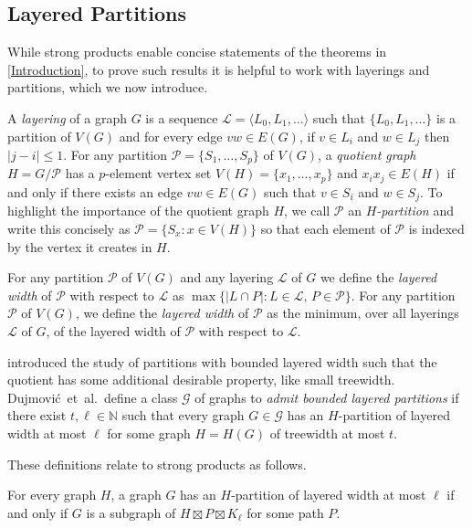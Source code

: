 \documentclass{patmorin}
\renewcommand{\leq}{\leqslant}
\begin{document}
\subsection{Layered Partitions}
\label{LayeredPartitions}

While strong products enable concise statements of the theorems in \cref{Introduction}, to prove such results it is helpful to work with layerings and partitions, which we now introduce.

A \emph{layering} of a graph $G$ is a sequence $\mathcal{L}=\langle L_0,L_1,\ldots\rangle$ such that $\{L_0,L_1,\ldots\}$ is a partition of $V(G)$ and for every edge $vw\in E(G)$, if $v\in L_i$ and $w\in L_j$ then $|j-i|\leq 1$.  For any partition $\mathcal{P}=\{S_1,\ldots,S_p\}$ of $V(G)$, a \emph{quotient graph} $H=G/\mathcal{P}$ has a $p$-element vertex set $V(H)=\{x_1,\ldots,x_p\}$ and $x_ix_j\in E(H)$ if and only if there exists an edge $vw\in E(G)$ such that $v\in S_i$ and $w\in S_j$. To highlight the importance of the quotient graph $H$, we call $\mathcal{P}$ an \emph{$H$-partition} and write this concisely as $\mathcal{P}=\{S_x : x\in V(H)\}$ so that each element of $\mathcal{P}$ is indexed by the vertex it creates in $H$.

For any partition $\mathcal{P}$ of $V(G)$ and any layering $\mathcal{L}$ of $G$ we define the \emph{layered width} of $\mathcal{P}$ with respect to $\mathcal{L}$ as $\max\{|L\cap P|: L\in\mathcal{L},\, P\in\mathcal{P}\}$.  For any partition $\mathcal{P}$ of $V(G)$, we define the \emph{layered width} of $\mathcal{P}$ as the minimum, over all layerings $\mathcal{L}$ of $G$, of the layered width of $\mathcal{P}$ with respect to $\mathcal{L}$.

\citet{dujmovic.joret.ea:planar} introduced the study of partitions with bounded layered width such that the quotient has some additional desirable property, like small treewidth. Dujmovi\'c~et~al.\ define a class $\mathcal{G}$ of graphs to \emph{admit bounded layered partitions} if there exist $t,\ell\in\mathbb{N}$ such that every graph $G\in \mathcal{G}$ has an $H$-partition of layered width at most $\ell$ for some graph $H=H(G)$ of treewidth at most $t$.

These definitions relate to strong products as follows.

\begin{lem}
	\label{PartitionProduct}
	For every graph $H$, a graph $G$ has an $H$-partition of layered width at most $\ell$ if and only if $G$ is a subgraph of $H \boxtimes P \boxtimes K_\ell$ for some path $P$.
\end{lem}
\end{document}
